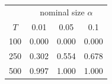 % 
\begin{tabular}{cccc}
  \hline
  & \multicolumn{3}{c}{nominal size $\alpha$} \\
 $T$ & 0.01 & 0.05 & 0.1 \\
 \hline
100 & 0.000 & 0.000 & 0.000 \\ 
  250 & 0.302 & 0.554 & 0.678 \\ 
  500 & 0.997 & 1.000 & 1.000 \\ 
   \hline
\end{tabular}
